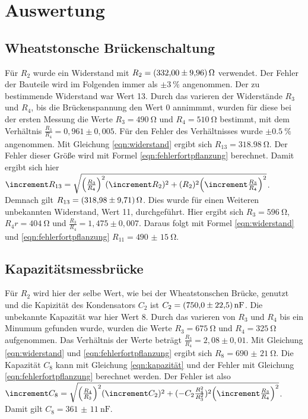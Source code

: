 \section{Auswertung}
\label{sec:Auswertung}

\subsection{Wheatstonsche Brückenschaltung}
Für $R_2$ wurde ein Widerstand mit $R_2=\qty{332(9,96)}{\ohm}$ verwendet.
Der Fehler der Bauteile wird im Folgenden immer als $\pm\qty{3}{\percent}$ angenommen.
Der zu bestimmende Widerstand war Wert 13.
Durch das varieren der Widerstände $R_3$ und $R_4$, bis die Brückenspannung den Wert 0 annimmmt, wurden für diese bei der ersten Messung die Werte
$R_3=\qty{490}{\ohm}$ und $R_4=\qty{510}{\ohm}$ bestimmt, mit dem Verhältnis $\frac{R_3}{R_4}=0,961\pm0,005$.
Für den Fehler des Verhältnisses wurde $\pm\qty{0,5}{\percent}$ angenommen.
Mit Gleichung \ref{eqn:widerstand} ergibt sich $R_{13}=\qty{318,98}{\ohm}$.
Der Fehler dieser Größe wird mit Formel \ref{eqn:fehlerfortpflanzung} berechnet.
Damit ergibt sich hier $\increment R_{13}=\sqrt{ \Bigl(\frac{R_3}{R_4}\Bigr)^2 (\increment R_2)^2+(R_2)^2 \Bigl(\increment \frac{R_3}{R_4}\Bigr)^2}$.
Demnach gilt $R_{13}=\qty{318,98(9,71)}{\ohm}$.
Dies wurde für einen Weiteren unbekannten Widerstand, Wert 11, durchgeführt.
Hier ergibt sich $R_3=\qty{596}{\ohm}$, $R_4r=\qty{404}{\ohm}$ und $\frac{R_3}{R_4}=1,475\pm0,007$.
Daraus folgt mit Formel \ref{eqn:widerstand} und \ref{eqn:fehlerfortpflanzung} $R_{11}=\qty{490(15)}{\ohm}$.

\subsection{Kapazitätsmessbrücke}
Für $R_2$ wird hier der selbe Wert, wie bei der Wheatstonschen Brücke, genutzt und die Kapizität des Kondensators $C_2$ ist $C_2=\qty{750(22,5)}{\nano\farad}$.
Die unbekannte Kapazität war hier Wert 8.
Durch das varieren von $R_3$ und $R_4$ bis ein Minumum gefunden wurde, wurden die Werte $R_3=\qty{675}{\ohm}$ und $R_4=\qty{325}{\ohm}$ aufgenommen.
Das Verhältnis der Werte beträgt $\frac{R_3}{R_4}=2,08\pm0,01$. 
Mit Gleichung \ref{eqn:widerstand} und \ref{eqn:fehlerfortpflanzung} ergibt sich $R_8=\qty{690(21)}{\ohm}$.
Die Kapazität $C_8$ kann mit Gleichung \ref{eqn:kapazität} und der Fehler mit Gleichung \ref{eqn:fehlerfortpflanzung} berechnet werden.
Der Fehler ist also $\increment C_{8}=\sqrt{ \Bigl(\frac{R_4}{R_3}\Bigr)^2 (\increment C_2)^2+(-C_2 \frac{R_4^2}{R_3^2})^2 \Bigl(\increment \frac{R_3}{R_4}\Bigr)^2}$.
Damit gilt $C_8=\qty{361(11)}{\nano\farad}$.\\

